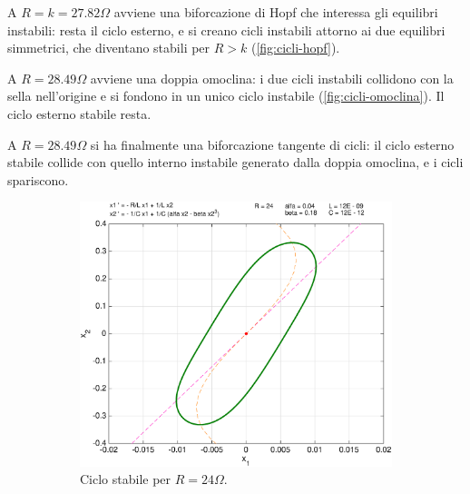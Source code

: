 \begin{enumerate}
A $R=k=27.82 \Omega$ avviene una biforcazione di Hopf che interessa gli equilibri instabili: resta il ciclo esterno, e si creano cicli instabili attorno ai due equilibri simmetrici, che diventano stabili per $R>k$ (\autoref{fig:cicli-hopf}).

A $R=28.49 \Omega$ avviene una doppia omoclina: i due cicli instabili collidono con la sella nell'origine e si fondono in un unico ciclo instabile (\autoref{fig:cicli-omoclina}). Il ciclo esterno stabile resta.

A $R=28.49 \Omega$ si ha finalmente una biforcazione tangente di cicli: il ciclo esterno stabile collide con quello interno instabile generato dalla doppia omoclina, e i cicli spariscono.

\begin{figure}
\centering
    \begin{subfigure}{0.8\textwidth}
            \includegraphics[width=\textwidth]{pplane/Cycle24ohm}
            \caption{Ciclo stabile per $R = 24 \Omega$.}
    \end{subfigure}
    \par\bigskip
    \begin{subfigure}{0.8\textwidth}

\end{subfigure}
\end{figure}
\end{enumerate}
